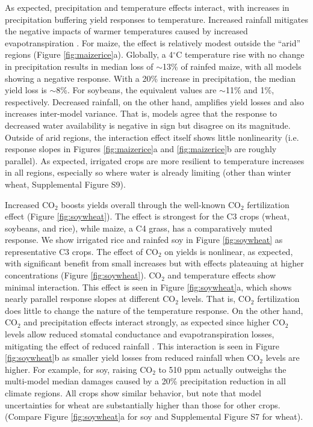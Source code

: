 \documentclass[gmd, manuscript]{copernicus} %
\providecommand{\DIFadd}[1]{{\protect\color{blue}\uwave{#1}}} %
\providecommand{\DIFaddbegin}{} %
\providecommand{\DIFaddend}{} %
\begin{document}
As expected, precipitation and temperature effects interact, with increases in precipitation buffering yield responses to temperature. 
Increased rainfall mitigates the negative impacts of warmer temperatures caused by increased evapotranspiration \citep[e.g.][]{Allen1998}. 
For maize, the effect is relatively modest outside the ``arid'' regions (Figure \ref{fig:maizerice}a). 
Globally, a 4$^\circ$C temperature rise with no change in precipitation results in median loss of $\sim$13\% of rainfed maize, with all models showing a negative response.
With a 20\% increase in precipitation, the median yield loss is $\sim$8\%. 
For soybeans, the equivalent values are $\sim$11\% and 1\%, respectively. 
Decreased rainfall, on the other hand, amplifies yield losses and also increases inter-model variance. 
That is, models agree that the response to decreased water availability is negative in sign but disagree on its magnitude. 
Outside of arid regions, the interaction effect itself shows little nonlinearity (i.e. response slopes in Figures \ref{fig:maizerice}a and \ref{fig:maizerice}b are roughly parallel). 
As expected, irrigated crops are more resilient to temperature increases in all regions, especially so where water is already limiting (other than winter wheat, Supplemental Figure S9).

Increased CO$_2$ boosts yields overall through the well-known CO$_2$ fertilization effect (Figure \ref{fig:soywheat}). 
The effect is strongest for the C3 crops (wheat, soybeans, and rice), while maize, a C4 grass, has a comparatively muted response. 
We show irrigated rice and rainfed soy in Figure \ref{fig:soywheat} as representative C3 crops.  
The effect of CO$_2$ on yields is nonlinear, as expected, with significant benefit from small increases but with effects plateauing at higher concentrations (Figure \ref{fig:soywheat}). 
CO$_2$ and temperature effects show minimal interaction. 
This effect is seen in Figure \ref{fig:soywheat}a, which shows nearly parallel response slopes at different CO$_2$ levels. 
That is, CO$_2$ fertilization does little to change the nature of the temperature response. 
On the other hand, CO$_2$ and precipitation effects interact strongly, as expected since higher CO$_2$ levels allow reduced stomatal conductance and evapotranspiration losses, mitigating the effect of reduced rainfall \DIFaddbegin \DIFadd{\mbox{%
\citep[e.g.][]{McGrath2013}}\hspace{0pt}%
}\DIFaddend . 
This interaction is seen in Figure \ref{fig:soywheat}b as smaller yield losses from reduced rainfall when CO$_2$ levels are higher. 
For example, for soy, raising CO$_2$ to 510 ppm actually outweighs the multi-model median damages caused by a 20\% precipitation reduction in all climate regions. 
All crops show similar behavior, but note that model uncertainties for wheat are substantially higher than those for other crops. 
(Compare Figure \ref{fig:soywheat}a for soy and Supplemental Figure S7 for wheat).
\end{document}
